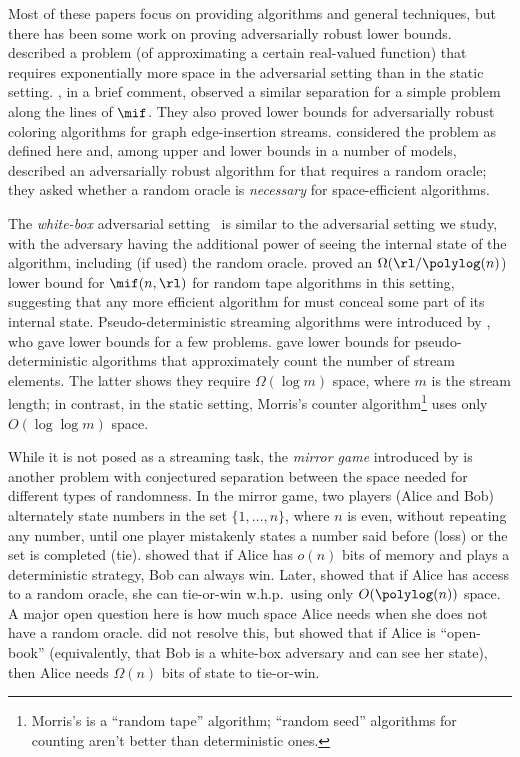 \begin{itemize}
\begin{itemize}
Most of these papers focus on providing algorithms and general techniques, but
there has been some work on proving adversarially robust lower bounds.
\cite{KaplanMNS21} described a problem (of approximating a certain real-valued
function) that requires exponentially more space in the adversarial setting
than in the static setting. \cite{ChakrabartiGS22}, in a brief comment,
observed a similar separation for a simple problem along the lines of $\mif$.
They also proved lower bounds for adversarially robust coloring algorithms for
graph edge-insertion streams. \cite{Stoeckl23} considered the \mif problem as
defined here and, among upper and lower bounds in a number of models,
described an adversarially robust algorithm for \mif that requires a random
oracle; they asked whether a random oracle is {\em necessary} for
space-efficient algorithms.

The {\em white-box} adversarial setting~\cite{AjtaiBJSSWZ22} is similar to the
adversarial setting we study, with the adversary having the additional power
of seeing the internal state of the algorithm, including (if used) the random
oracle.  \cite{Stoeckl23} proved an $\Omega(\rl/\polylog(n)$) lower bound for
$\mif(n,\rl)$ for random tape algorithms in this setting, suggesting that any
more efficient algorithm for \mif must conceal some part of its internal
state. Pseudo-deterministic streaming algorithms were introduced by
\cite{GoldwasserGMW20}, who gave lower bounds for a few problems.
\cite{BravermanKKS23, GrossmanGS23} gave lower bounds for pseudo-deterministic
algorithms that approximately count the number of stream elements. The latter
shows they require $\Omega(\log m)$ space, where $m$ is the stream length; in
contrast, in the static setting, Morris's counter algorithm\footnote{Morris's
is a ``random tape'' algorithm; ``random seed'' algorithms for counting aren't
better than deterministic ones.} uses only $O(\log \log m)$ space.

While it is not posed as a streaming task, the {\em mirror game} introduced by
\cite{GargS18} is another problem with conjectured separation between the
space needed for different types of randomness. In the mirror game, two
players (Alice and Bob) alternately state numbers in the set $\{1,\ldots,n\}$,
where $n$ is even, without repeating any number, until one player mistakenly
states a number said before (loss) or the set is completed (tie).
\cite{GargS18} showed that if Alice has $o(n)$ bits of memory and plays a
deterministic strategy, Bob can always win. Later, \cite{Feige19, MenuhinN22}
showed that if Alice has access to a random oracle, she can tie-or-win
w.h.p.~using only $O(\polylog(n))$ space. A major open question here is how
much space Alice needs when she does not have a random oracle. \cite{MagenN22}
did not resolve this, but showed that if Alice is ``open-book'' (equivalently,
that Bob is a white-box adversary and can see her state), then Alice needs
$\Omega(n)$ bits of state to tie-or-win.


\end{itemize}
\end{itemize}
